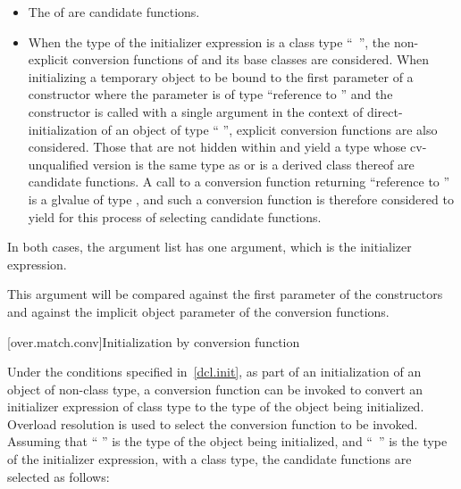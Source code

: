 \begin{itemize}
\item
The  of
are candidate functions.
\item
When the type of the initializer expression is a class type
``\cv{}~'',
the non-explicit conversion functions of
and its base classes are considered.
When initializing a temporary object
to be bound to the first parameter of a constructor
where the parameter is of type
``reference to  ''
and the constructor is
called with a single argument in the context of
direct-initialization of an object of type `` '', explicit
conversion functions are also considered.
Those that are not hidden within
and yield a type whose cv-unqualified version is the same type as
or is a derived class thereof
are candidate functions.
A call to a conversion function returning ``reference to ''
is a glvalue of type , and such a conversion function is
therefore considered to yield  for this process of selecting
candidate functions.
\end{itemize}

\pnum
In both cases, the argument list has one argument, which is the initializer
expression.
\begin{note}
This argument will be compared against
the first parameter of the constructors and against the implicit
object parameter of the conversion functions.
\end{note}

[over.match.conv]{Initialization by conversion function}%

\pnum
Under the conditions specified in~\ref{dcl.init}, as
part of an initialization of an object of non-class type,
a conversion function can be invoked to convert an initializer
expression of class type to the type of the object
being initialized.
Overload resolution is used to select the
conversion function to be invoked.
Assuming that `` '' is the
type of the object being initialized, and ``\cv{}~'' is the type
of the initializer expression, with
a class type,
the candidate functions are selected as follows:

